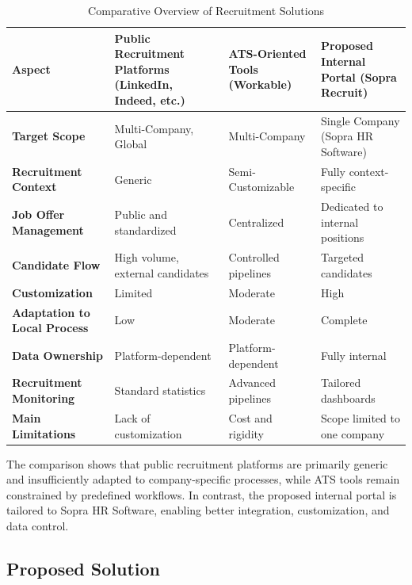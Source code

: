 \begin{table}[H]
\centering
\renewcommand{\arraystretch}{1.6}
\begin{tabularx}{\textwidth}{|>{\bfseries\centering\arraybackslash}p{3.5cm}|>{\centering\arraybackslash}X|>{\centering\arraybackslash}p{3cm}|>{\centering\arraybackslash}p{3.5cm}|}
\hline
\rowcolor{headerblue}
\textbf{Aspect}
  & \textbf{Public Recruitment Platforms (LinkedIn, Indeed, etc.)}
  & \textbf{ATS-Oriented Tools (Workable)}
  & \textbf{Proposed Internal Portal (Sopra Recruit)} \\
\hline
Target Scope
  & Multi-Company, Global
  & Multi-Company
  & Single Company (Sopra HR Software) \\
\hline
Recruitment Context
  & Generic
  & Semi-Customizable
  & Fully context-specific \\
\hline
Job Offer Management
  & Public and standardized
  & Centralized
  & Dedicated to internal positions \\
\hline
Candidate Flow
  & High volume, external candidates
  & Controlled pipelines
  & Targeted candidates \\
\hline
Customization
  & Limited
  & Moderate
  & High \\
\hline
Adaptation to Local Process
  & Low
  & Moderate
  & Complete \\
\hline
Data Ownership
  & Platform-dependent
  & Platform-dependent
  & Fully internal \\
\hline
Recruitment Monitoring
  & Standard statistics
  & Advanced pipelines
  & Tailored dashboards \\
\hline
Main Limitations
  & Lack of customization
  & Cost and rigidity
  & Scope limited to one company \\
\hline
\end{tabularx}
\caption{Comparative Overview of Recruitment Solutions}
\end{table}

The comparison shows that public recruitment platforms are primarily generic and insufficiently adapted to company-specific processes, while ATS tools remain constrained by predefined workflows. In contrast, the proposed internal portal is tailored to Sopra HR Software, enabling better integration, customization, and data control.

\subsection{Proposed Solution}

